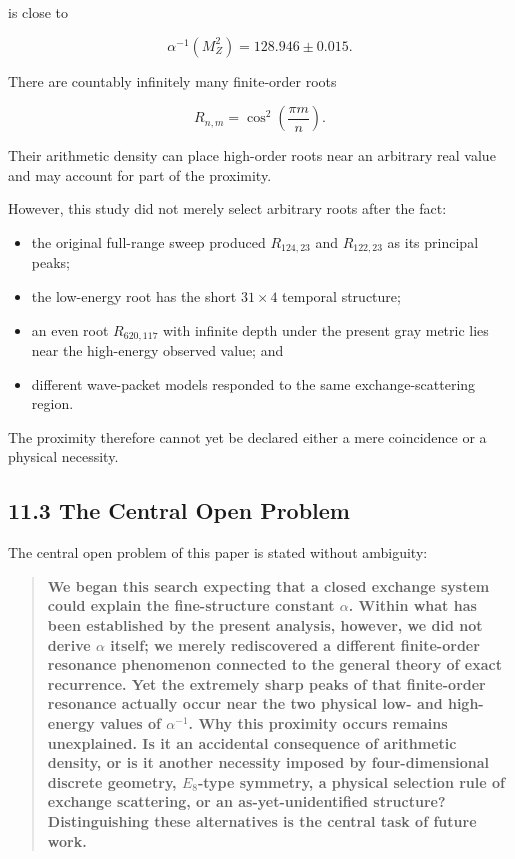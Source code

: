 \documentclass[
  10pt,
  a4paper,
]{article}
\providecommand{\tightlist}{%
  \setlength{\itemsep}{0pt}\setlength{\parskip}{0pt}}
\begin{document}
is close to

\[
\alpha^{-1}(M_Z^2)
=128.946\pm0.015.
\]

There are countably infinitely many finite-order roots

\[
R_{n,m}=\cos^2\left(\frac{\pi m}{n}\right).
\]

Their arithmetic density can place high-order roots near an arbitrary
real value and may account for part of the proximity.

However, this study did not merely select arbitrary roots after the
fact:

\begin{itemize}
\tightlist
\item
  the original full-range sweep produced \(R_{124,23}\) and
  \(R_{122,23}\) as its principal peaks;
\item
  the low-energy root has the short \(31\times4\) temporal structure;
\item
  an even root \(R_{620,117}\) with infinite depth under the present
  gray metric lies near the high-energy observed value; and
\item
  different wave-packet models responded to the same exchange-scattering
  region.
\end{itemize}

The proximity therefore cannot yet be declared either a mere coincidence
or a physical necessity.

\subsection{11.3 The Central Open
Problem}\label{the-central-open-problem}

The central open problem of this paper is stated without ambiguity:

\begin{quote}
\textbf{We began this search expecting that a closed exchange system
could explain the fine-structure constant \(\alpha\). Within what has
been established by the present analysis, however, we did not derive
\(\alpha\) itself; we merely rediscovered a different finite-order
resonance phenomenon connected to the general theory of exact
recurrence. Yet the extremely sharp peaks of that finite-order resonance
actually occur near the two physical low- and high-energy values of
\(\alpha^{-1}\). Why this proximity occurs remains unexplained. Is it an
accidental consequence of arithmetic density, or is it another necessity
imposed by four-dimensional discrete geometry, \(E_8\)-type symmetry, a
physical selection rule of exchange scattering, or an
as-yet-unidentified structure? Distinguishing these alternatives is the
central task of future work.}
\end{quote}
\end{document}
